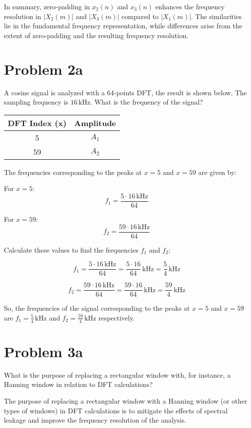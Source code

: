 \documentclass{article}
\begin{document}
In summary, zero-padding in \(x_2(n)\) and \(x_3(n)\) enhances the frequency resolution in \(|X_2(m)|\) and \(|X_3(m)|\) compared to \(|X_1(m)|\). The similarities lie in the fundamental frequency representation, while differences arise from the extent of zero-padding and the resulting frequency resolution.\\

\section*{Problem 2a}
A cosine signal is analyzed with a 64-points DFT, the result is shown below. The sampling frequency is \(16 \, \text{kHz}\). What is the frequency of the signal?

\begin{center}
\begin{tabular}{|c|c|}
\hline
\textbf{DFT Index (x)} & \textbf{Amplitude} \\
\hline
5 & $A_1$ \\
\hline
59 & $A_2$ \\
\hline
\end{tabular}
\end{center}

The frequencies corresponding to the peaks at \(x = 5\) and \(x = 59\) are given by:

For \(x = 5\):
\[ f_1 = \frac{5 \cdot 16 \, \text{kHz}}{64} \]

For \(x = 59\):
\[ f_2 = \frac{59 \cdot 16 \, \text{kHz}}{64} \]

Calculate these values to find the frequencies \(f_1\) and \(f_2\):

\[
f_1 = \frac{5 \cdot 16 \, \text{kHz}}{64} = \frac{5 \cdot 16}{64} \, \text{kHz} = \frac{5}{4} \, \text{kHz}
\]

\[
f_2 = \frac{59 \cdot 16 \, \text{kHz}}{64} = \frac{59 \cdot 16}{64} \, \text{kHz} = \frac{59}{4} \, \text{kHz}
\]

So, the frequencies of the signal corresponding to the peaks at \(x = 5\) and \(x = 59\) are \(f_1 = \frac{5}{4} \, \text{kHz}\) and \(f_2 = \frac{59}{4} \, \text{kHz}\) respectively.

\section*{Problem 3a}
What is the purpose of replacing a rectangular window with, for instance, a Hanning window in relation to DFT calculations?

The purpose of replacing a rectangular window with a Hanning window (or other types of windows) in DFT calculations is to mitigate the effects of spectral leakage and improve the frequency resolution of the analysis.
\end{document}

